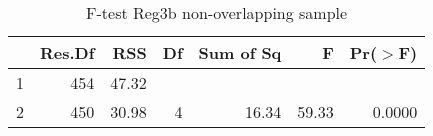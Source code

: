 \begin{table}[htbp!]
\centering
\caption{F-test Reg3b non-overlapping sample} 
\begin{tabular}{lrrrrrr}
  \hline
 & Res.Df & RSS & Df & Sum of Sq & F & Pr($>$F) \\ 
  \hline
1 & 454 & 47.32 &  &  &  &  \\ 
  2 & 450 & 30.98 & 4 & 16.34 & 59.33 & 0.0000 \\ 
   \hline
\end{tabular}
\end{table}
